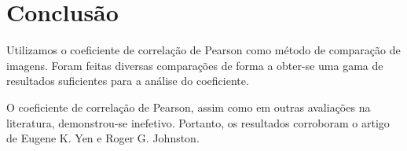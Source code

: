 \documentclass[10pt,a4paper]{article}
\begin{document}
\newpage
\section{Conclusão}
Utilizamos o coeficiente de correlação de Pearson  
 como método de comparação de imagens. Foram feitas diversas
 comparações de forma a obter-se uma gama de resultados suficientes
 para a análise do coeficiente.

O coeficiente de correlação de Pearson, assim como em outras
avaliações na literatura, demonstrou-se inefetivo. Portanto, os
resultados corroboram o artigo de Eugene K. Yen e
Roger G. Johnston.



\begin{small}
  
\end{small}
\end{document}
